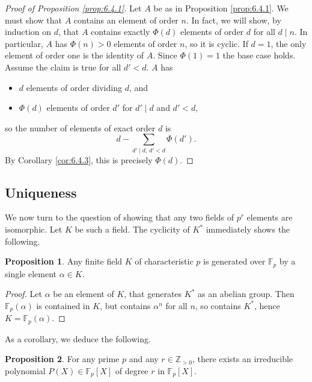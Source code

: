 \documentclass{article}
\newcommand{\F}{\mathbb{F}}
\newcommand{\Z}{\mathbb{Z}}
\newcommand{\rb}[1]{\left( #1 \right)}
\renewcommand{\sb}[1]{\left[ #1 \right]}
\theoremstyle{definition}\newtheorem{definition}{Definition}[subsection]
\theoremstyle{definition}\newtheorem{remark}[definition]{Remark}
\theoremstyle{definition}\newtheorem*{example}{Example}
\theoremstyle{definition}\newtheorem*{note}{Note}
\newtheorem{proposition}[definition]{Proposition}
\begin{document}
\begin{proof}[Proof of Proposition \ref{prop:6.4.1}]
Let $ A $ be as in Proposition \ref{prop:6.4.1}. We must show that $ A $ contains an element of order $ n $. In fact, we will show, by induction on $ d $, that $ A $ contains exactly $ \Phi\rb{d} $ elements of order $ d $ for all $ d \mid n $. In particular, $ A $ has $ \Phi\rb{n} > 0 $ elements of order $ n $, so it is cyclic. If $ d = 1 $, the only element of order one is the identity of $ A $. Since $ \Phi\rb{1} = 1 $ the base case holds. Assume the claim is true for all $ d' < d $. $ A $ has
\begin{itemize}
\item $ d $ elements of order dividing $ d $, and
\item $ \Phi\rb{d} $ elements of order $ d' $ for $ d' \mid d $ and $ d' < d $,
\end{itemize}
so the number of elements of exact order $ d $ is
$$ d - \sum_{d' \mid d, \ d' < d} \Phi\rb{d'}. $$
By Corollary \ref{cor:6.4.3}, this is precisely $ \Phi\rb{d} $.
\end{proof}

\subsection{Uniqueness}

We now turn to the question of showing that any two fields of $ p^r $ elements are isomorphic. Let $ K $ be such a field. The cyclicity of $ K^* $ immediately shows the following.

\begin{proposition}
Any finite field $ K $ of characteristic $ p $ is generated over $ \F_p $ by a single element $ \alpha \in K $.
\end{proposition}

\begin{proof}
Let $ \alpha $ be an element of $ K $, that generates $ K^* $ as an abelian group. Then $ \F_p\rb{\alpha} $ is contained in $ K $, but contains $ \alpha^n $ for all $ n $, so contains $ K^* $, hence $ K = \F_p\rb{\alpha} $.
\end{proof}

As a corollary, we deduce the following.

\begin{proposition}
For any prime $ p $ and any $ r \in \Z_{> 0} $, there exists an irreducible polynomial $ P\rb{X} \in \F_p\sb{X} $ of degree $ r $ in $ \F_p\sb{X} $.
\end{proposition}
\end{document}
